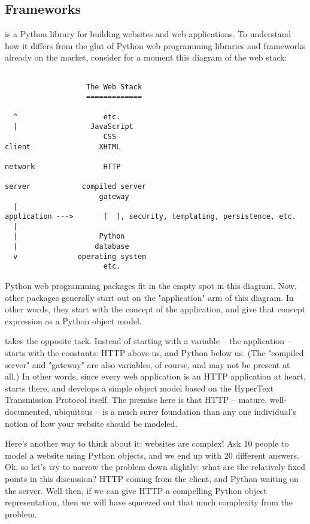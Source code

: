 \subsection{Frameworks \label{frameworks}}

 is a Python library for building websites and web applications.
To understand how it differs from the glut of Python web programming libraries
and frameworks already on the market, consider for a moment this diagram of the
web stack:

\begin{verbatim}

                   The Web Stack
                   =============

  ^                    etc.
  |                 JavaScript
                       CSS
client                XHTML

network                HTTP

server            compiled server
                      gateway
  |
application --->       [  ], security, templating, persistence, etc.
  |
  |                   Python
  |                  database
  v              operating system
                       etc.

\end{verbatim}

Python web programming packages fit in the empty spot in this diagram. Now,
other packages generally start out on the "application" arm of this diagram. In
other words, they start with the concept of the \b{application}, and give that
concept expression as a Python object model.

 takes the opposite tack. Instead of starting with a variable --
the application --  starts with the constants: HTTP above us, and
Python below us. (The "compiled server" and "gateway" are also variables, of
course, and may not be present at all.) In other words, since every web
application is an HTTP application at heart,  starts there, and
develops a simple object model based on the HyperText Transmission Protocol
itself. The premise here is that HTTP -- mature, well-documented, ubiquitous --
is a much surer foundation than any one individual's notion of how your website
should be modeled.

Here's another way to think about it: websites are complex! Ask 10 people to
model a website using Python objects, and we end up with 20 different answers.
Ok, so let's try to narrow the problem down slightly: what are the relatively
fixed points in this discussion? HTTP coming from the client, and Python waiting
on the server. Well then, if we can give HTTP a compelling Python object
representation, then we will have squeezed out that much complexity from the
problem.



